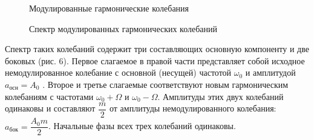 \documentclass[12pt]{kiarticle}
\begin{document}
\begin{enumerate}
		\begin{figure}[h]
			\begin{minipage}[h]{0.5\linewidth}
				\caption{Модулированные гармонические колебания}
			\end{minipage}
			\begin{minipage}[h]{0.5\linewidth}
				\caption{Спектр модулированных гармонических колебаний}
			\end{minipage}
		\end{figure}
		
		Спектр таких колебаний содержит три составляющих  основную
		компоненту и две боковых (рис. 6). Первое слагаемое в правой части представляет собой исходное немодулированное колебание
		с основной (несущей) частотой $\omega_{0}$ и амплитудой $a_{осн} = A_{0}$ . Второе и третье слагаемые соответствуют новым гармоническим колебаниям с частотами $\omega_{0} + \Omega$ и $\omega_{0} - \Omega$. Амплитуды этих двух колебаний одинаковы и составляют $\dfrac{m}{2}$ от амплитуды немодулированного колебания:
		$a_{бок} = \dfrac{A_{0}m}{2}$. Начальные фазы всех трех колебаний одинаковы.
	\end{enumerate}
\end{document}
